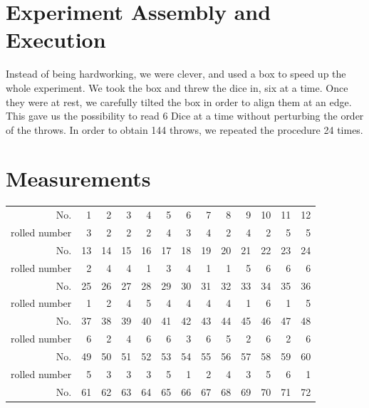 \documentclass{scrreprt}
\begin{document}
\section[The Experiment]{Experiment Assembly and Execution}
Instead of being hardworking, we were clever, and used a box to speed up the whole experiment. We took the box and threw the dice in, six at a time. Once they were at rest, we carefully tilted the box in order to align them at an edge. This gave us the possibility to read 6 Dice at a time without perturbing the order of the throws. In order to obtain 144 throws, we repeated the procedure 24 times.
\section{Measurements}

\begin{table}[H]
  \centering
    \begin{tabular}{r||rrrrrrrrrrrr}
    No.   & 1     & 2     & 3     & 4     & 5     & 6     & 7     & 8     & 9     & 10    & 11    & 12 \\
    rolled number & 3     & 2     & 2     & 2     & 4     & 3     & 4     & 2     & 4     & 2     & 5     & 5 \\ \hline
    No.   & 13    & 14    & 15    & 16    & 17    & 18    & 19    & 20    & 21    & 22    & 23    & 24 \\
    rolled number & 2     & 4     & 4     & 1     & 3     & 4     & 1     & 1     & 5     & 6     & 6     & 6 \\ \hline
    No.   & 25    & 26    & 27    & 28    & 29    & 30    & 31    & 32    & 33    & 34    & 35    & 36 \\
    rolled number & 1     & 2     & 4     & 5     & 4     & 4     & 4     & 4     & 1     & 6     & 1     & 5 \\ \hline
    No.   & 37    & 38    & 39    & 40    & 41    & 42    & 43    & 44    & 45    & 46    & 47    & 48 \\
    rolled number & 6     & 2     & 4     & 6     & 6     & 3     & 6     & 5     & 2     & 6     & 2     & 6 \\ \hline
    No.   & 49    & 50    & 51    & 52    & 53    & 54    & 55    & 56    & 57    & 58    & 59    & 60 \\
    rolled number & 5     & 3     & 3     & 3     & 5     & 1     & 2     & 4     & 3     & 5     & 6     & 1 \\ \hline
    No.   & 61    & 62    & 63    & 64    & 65    & 66    & 67    & 68    & 69    & 70    & 71    & 72 \\

\end{tabular}
\end{table}
\end{document}
